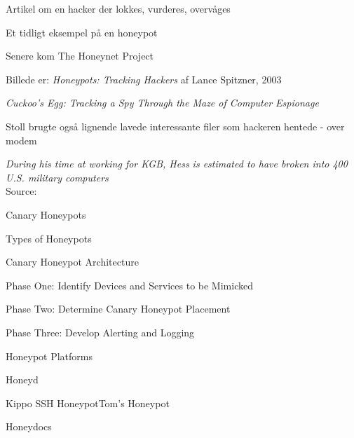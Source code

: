 \documentclass[Screen16to9,17pt]{foils}
\begin{document}




\begin{list1}
\item Artikel om en hacker der lokkes, vurderes, overvåges
\item Et tidligt eksempel på en honeypot
\item Senere kom The Honeynet Project 
\item Billede er: \emph{Honeypots: Tracking Hackers}
af Lance Spitzner, 2003
\end{list1}


\begin{list1}
\item
\emph{Cuckoo's Egg: Tracking a Spy Through the Maze of Computer
 Espionage}
 \item  Stoll brugte også lignende lavede interessante filer som hackeren hentede - over modem
\item \emph{During his time at working for KGB, Hess is estimated to have broken into 400 U.S. military computers}\\
Source: 
\end{list1}



\begin{list1}
\item Canary Honeypots
\item Types of Honeypots
\item Canary Honeypot Architecture
\begin{list2}
\item Phase One: Identify Devices and Services to be Mimicked
\item Phase Two: Determine Canary Honeypot Placement
\item Phase Three: Develop Alerting and Logging
\end{list2}
\item Honeypot Platforms
\begin{list2}
\item Honeyd
\item Kippo SSH HoneypotTom’s Honeypot
\item Honeydocs
\end{list2}
\end{list1}
\end{document}
